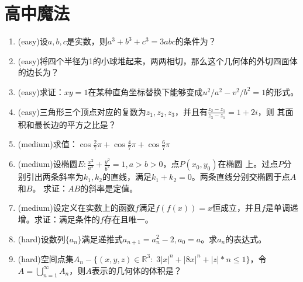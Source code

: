 \documentclass[a4paper]{article}
\begin{document}
\section{高中魔法}
\begin{enumerate}
\item (easy)设$a,b,c$是实数，则$a^3+b^3+c^3=3abc$的条件为？
\item (easy)将四个半径为1的小球堆起来，两两相切，那么这个几何体的外切四面体的边长为？
\item (easy)求证：$xy=1$在某种直角坐标替换下能够变成$u^2/a^2-v^2/b^2=1$的形式。
\item (easy)三角形三个顶点对应的复数为$z_1,z_2,z_3$，并且有$\frac{z_2-z_1}{z_3-z_1}=1+2i$，则
其面积和最长边的平方之比是？
\item (medium)求值：$\cos\frac{2}{7}\pi+\cos\frac{4}{7}\pi+\cos\frac{6}{7}\pi$
\item (medium)设椭圆$E:\frac{x^2}{a^2}+\frac{y^2}{b^2}=1,a>b>0$，点$P(x_0,y_0)$在椭圆
上。过点$P$分别引出两条斜率为$k_1,k_2$的直线，满足$k_1+k_2=0$。两条直线分别交椭圆于点$A$和$B$。
求证：$AB$的斜率是定值。
\item (medium)设定义在实数上的函数$f$满足$f(f(x))=x$恒成立，并且$f$是单调递增。求证：满足条件的$f$存在且唯一。
\item (hard)设数列$\{a_n\}$满足递推式$a_{n+1}=a_n^2-2,a_0=a$。求$a_n$的表达式。
\item (hard)空间点集$A_n-\{(x,y,z)\in\mathbb{R}^3:\; 3|x|^n+|8x|^n+|z|*n \leqslant 1\}$，令
$A=\bigcup_{n=1}^{\infty}A_n$，则$A$表示的几何体的体积是？
\end{enumerate}
\end{document}
